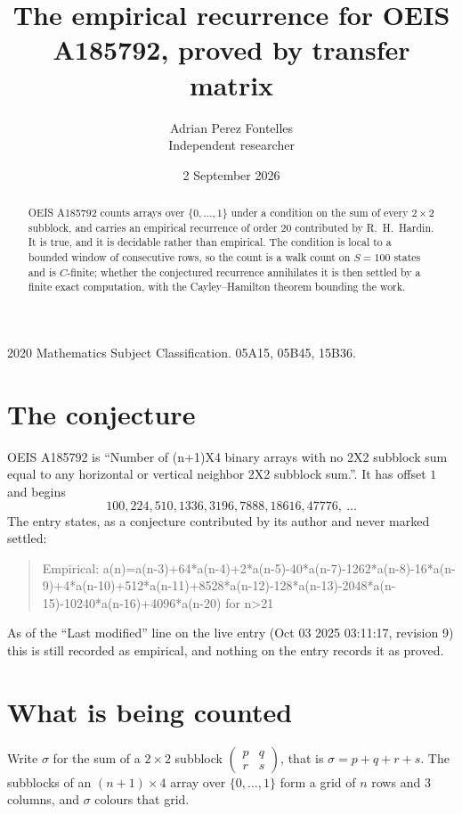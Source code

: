 \documentclass[11pt,a4paper]{article}
\title{The empirical recurrence for OEIS A185792, proved by transfer matrix}
\author{Adrian Perez Fontelles\\ \small Independent researcher}
\date{2 September 2026}
\theoremstyle{plain}
\theoremstyle{definition}
\begin{document}
\maketitle

\begin{abstract}
OEIS A185792 counts arrays over $\{0,\dots,1\}$ under a condition on the sum of every
$2\times2$ subblock, and carries an empirical recurrence of order $20$ contributed by
R.~H.~Hardin. It is true, and it is decidable rather than empirical. The condition is local to
a bounded window of consecutive rows, so the count is a walk count on $S=100$ states and is
$C$-finite; whether the conjectured recurrence annihilates it is then settled by a finite exact
computation, with the Cayley--Hamilton theorem bounding the work.
\end{abstract}

\noindent\small 2020 Mathematics Subject Classification. 05A15, 05B45, 15B36.\normalsize

\section{The conjecture}

OEIS A185792 is ``Number of (n+1)X4 binary arrays with no 2X2 subblock sum equal to any horizontal or vertical neighbor 2X2 subblock sum.''. It has offset $1$ and begins
\[
100, 224, 510, 1336, 3196, 7888, 18616, 47776,\ \dots
\]
The entry states, as a conjecture contributed by its author and never marked settled:
\begin{quote}
Empirical: a(n)=a(n-3)+64*a(n-4)+2*a(n-5)-40*a(n-7)-1262*a(n-8)-16*a(n-9)+4*a(n-10)+512*a(n-11)+8528*a(n-12)-128*a(n-13)-2048*a(n-15)-10240*a(n-16)+4096*a(n-20) for n>21
\end{quote}
As of the ``Last modified'' line on the live entry (Oct 03 2025 03:11:17, revision 9) this is still
recorded as empirical, and nothing on the entry records it as proved.

\section{What is being counted}

Write $\sigma$ for the sum of a $2\times2$ subblock
$\begin{pmatrix}p&q\\r&s\end{pmatrix}$, that is $\sigma=p+q+r+s$. The subblocks of an
$(n+1)\times4$ array over $\{0,\dots,1\}$ form a grid of $n$ rows and $3$
columns, and $\sigma$ colours that grid.
\end{document}
